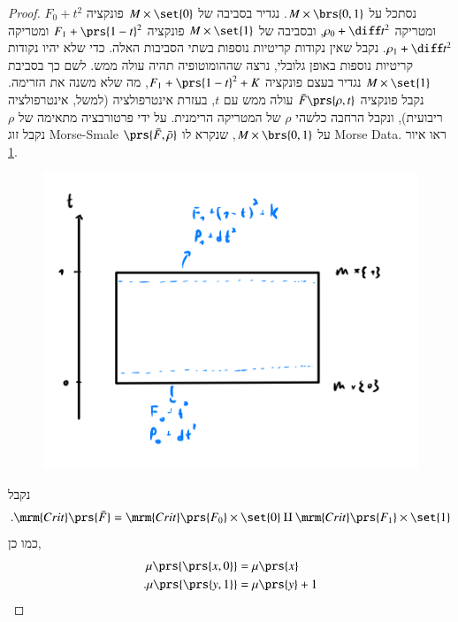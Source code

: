 \documentclass[a4paper,10pt,twoside,openany]{book}
\begin{document}
\begin{proof}
נסתכל על
$M \times \brs{0,1}$.
נגדיר בסביבה של
$M \times \set{0}$
פונקציה
$F_0 + t^2$
ומטריקה
$\rho_0 + \diff t^2$,
ובסביבה של
$M \times \set{1}$
פונקציה
$F_1 + \prs{1-t}^2$
ומטריקה
$\rho_1 + \diff t^2$.
נקבל שאין נקודות קריטיות נוספות בשתי הסביבות האלה. כדי שלא יהיו נקודות קריטיות נוספות באופן גלובלי, נרצה שההומוטופיה תהיה עולה ממש.
לשם כך בסביבת
$M \times \set{1}$
נגדיר בעצם פונקציה
$F_1 + \prs{1-t}^2 + K$,
מה שלא משנה את הזרימה.
נקבל פונקציה
$\bar{F}\prs{\rho,t}$
עולה ממש עם
$t$,
בעזרת אינטרפולציה (למשל, אינטרפולציה ריבועית), ונקבל הרחבה כלשהי
$\rho$
של המטריקה הרימנית.
על ידי פרטורבציה מתאימה של
$\rho$
נקבל זוג
\textenglish{Morse-Smale}
$\prs{\bar{F}, \bar{\rho}}$
על
$M \times \brs{0,1}$,
שנקרא לו
\textenglish{Morse Data}.
ראו איור
\ref{7.2}.

\begin{figure}
\centering
\includegraphics[scale=0.5]{sources/7.2}
\caption{}
\label{7.2}
\end{figure}

נקבל
\[\text{.} \mrm{Crit}\prs{\bar{F}} = \mrm{Crit}\prs{F_0} \times \set{0} \amalg \mrm{Crit}\prs{F_1} \times \set{1}\]
כמו כן,
\begin{align*}
\mu\prs{\prs{x,0}} &= \mu\prs{x} \\
\text{.} \mu\prs{\prs{y,1}} &= \mu\prs{y} + 1
\end{align*}


\end{proof}
\end{document}
